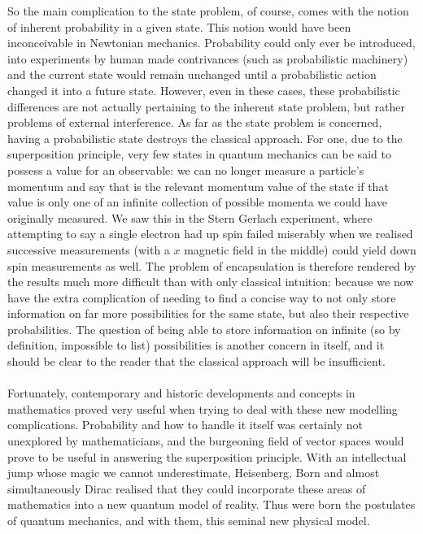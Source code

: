 So the main complication to the state problem, of course, comes with the notion of inherent probability in a given state. This notion would have been inconceivable in Newtonian mechanics. Probability could only ever be introduced, into experiments by human made contrivances (such as probabilistic machinery) and the current state would remain unchanged until a probabilistic action changed it into a future state. However, even in these cases, these probabilistic differences are not actually pertaining to the inherent state problem, but rather problems of external interference. As far as the state problem is concerned, having a probabilistic state destroys the classical approach. For one, due to the superposition principle, very few states in quantum mechanics can be said to possess a value for an observable: we can no longer measure a particle's momentum and say that is the relevant momentum value of the state if that value is only one of an infinite collection of possible momenta we could have originally measured. We saw this in the Stern Gerlach experiment, where attempting to say a single electron had up spin failed miserably when we realised successive measurements (with a $x$ magnetic field in the middle) could yield down spin measurements as well. The problem of encapsulation is therefore rendered by the results much more difficult than with only classical intuition: because we now have the extra complication of needing to find a concise way to not only store information on far more possibilities for the same state, but also their respective probabilities. The question of being able to store information on infinite (so by definition, impossible to list) possibilities is another concern in itself, and it should be clear to the reader that the classical approach will be insufficient.
\\\\
Fortunately, contemporary and historic developments and concepts in mathematics proved very useful when trying to deal with these new modelling complications. Probability and how to handle it itself was certainly not unexplored by mathematicians, and the burgeoning field of vector spaces would prove to be useful in answering the superposition principle. With an intellectual jump whose magic we cannot underestimate, Heisenberg, Born and almost simultaneously Dirac realised that they could incorporate these areas of mathematics into a new quantum model of reality. Thus were born the postulates of quantum mechanics, and with them, this seminal new physical model.
